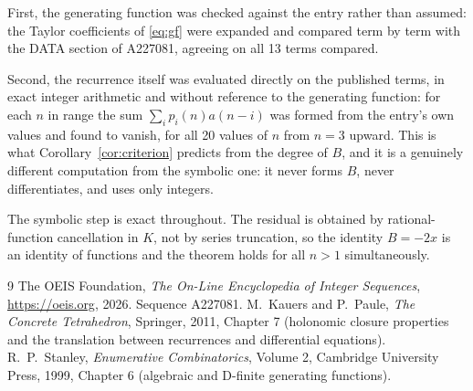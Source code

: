 \documentclass[11pt,a4paper]{article}
\theoremstyle{plain}
\theoremstyle{definition}
\begin{document}
First, the generating function was checked against the entry rather than assumed: the
Taylor coefficients of \eqref{eq:gf} were expanded and compared term by term with the DATA
section of A227081, agreeing on all 13 terms compared.

Second, the recurrence itself was evaluated directly on the published terms, in exact
integer arithmetic and without reference to the generating function: for each $n$ in range
the sum $\sum_{i}p_{i}(n)a(n-i)$ was formed from the entry's own values and found to
vanish, for all 20 values of $n$ from $n=3$ upward. This is what
Corollary~\ref{cor:criterion} predicts from the degree of $B$, and it is a genuinely
different computation from the symbolic one: it never forms $B$, never differentiates, and
uses only integers.

The symbolic step is exact throughout. The residual is obtained by rational-function
cancellation in $K$, not by series truncation, so the identity $B=- 2 x$ is an
identity of functions and the theorem holds for all $n>1$ simultaneously.

\begin{thebibliography}{9}
 The OEIS Foundation, \emph{The On-Line Encyclopedia of Integer Sequences},
\url{https://oeis.org}, 2026. Sequence A227081.
 M.~Kauers and P.~Paule, \emph{The Concrete Tetrahedron}, Springer, 2011,
Chapter 7 (holonomic closure properties and the translation between recurrences and
differential equations).
 R.~P.~Stanley, \emph{Enumerative Combinatorics}, Volume 2, Cambridge
University Press, 1999, Chapter 6 (algebraic and D-finite generating functions).
\end{thebibliography}
\end{document}
